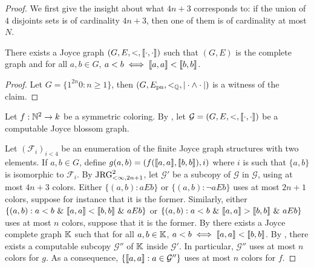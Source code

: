 \begin{proof}
  We first give the insight about what $4n+3$ corresponds to: if the union of $4$ disjoints sets is of cardinality $4n+3$, then one of them is of cardinality at most $N$.
  \begin{claim}\label{cl:Joyce-complete-linear-graph}
    There exists a Joyce graph $(G,E,<,\llbracket \cdot , \cdot \rrbracket)$ such that $(G,E)$ is the complete graph and for all $a,b\in G$, $a<b\iff \llbracket a , a \rrbracket<\llbracket b , b \rrbracket$.
  \end{claim}
  \begin{proof}
    Let $G=\{1^{2n}0:n\geq 1\}$, then $(G,E_{\mathrm{pn}}, <_{\mathbb{Q}}, |\cdot\wedge\cdot|)$ is a witness of the claim.    
  \end{proof}
Let $f:\mathbb{N}^2\to k$ be a symmetric coloring. By , let $\mathcal{G}=(G,E,<,\llbracket \cdot , \cdot \rrbracket)$ be a computable Joyce blossom graph. %

  Let $(\mathcal{F}_i)_{i<4}$ be an enumeration of the finite Joyce graph structures with two elements. If $a,b\in G$, define $g(a,b)=( f(\llbracket a , a \rrbracket, \llbracket b , b \rrbracket), i)$ where $i$ is such that $\{a,b\}$ is isomorphic to $\mathcal{F}_i$. By $\mathrm{JRG}^2_{<\infty, 2n+1}$, let $\mathcal{G}'$ be a subcopy of $\mathcal{G}$ in $\mathcal{G}$, using at most $4n+3$ colors. Either $\{(a,b):aEb\}$ or $\{(a,b):\lnot aEb\}$ uses at most $2n+1$ colors, suppose for instance that it is the former. Similarly, either $\{(a,b):a<b\ \&\  \llbracket a , a \rrbracket<\llbracket b , b \rrbracket\ \&\  aEb\}$ or $\{(a,b):a<b\ \&\  \llbracket a , a \rrbracket>\llbracket b , b \rrbracket\ \&\  aEb\}$ uses at most $n$ colors, suppose that it is the former. By  there exists a Joyce complete graph $\mathbb{K}$ such that  for all $a,b\in \mathbb{K}$, $a<b\iff \llbracket a , a \rrbracket<\llbracket b , b \rrbracket$. By , there exists a computable subcopy $\mathcal{G}''$ of $\mathbb{K}$ inside $\mathcal{G}'$. In particular, $\mathcal{G}''$ uses at most $n$ colors for $g$. As a consequence, $\{\llbracket a , a \rrbracket:a\in\mathcal{G}''\}$ uses at most $n$ colors for $f$.
\end{proof}


